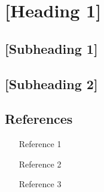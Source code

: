 \documentclass[11pt]{article} %
\begin{document}
	\pagebreak
	
	
	\tableofcontents
	\pagebreak
	
	\section{[Heading 1]}    	 		%
	\lipsum[1-1]
	
	\subsection{[Subheading 1]}
	\lipsum[2-4] %
	
	\subsection{[Subheading 2]}
	\lipsum[1-1]
	
	\subsection{References}
	\begin{itemize}
		\item [Reference 1]
		\item [Reference 2]
		\item [Reference 3]
	\end{itemize}
\end{document}
